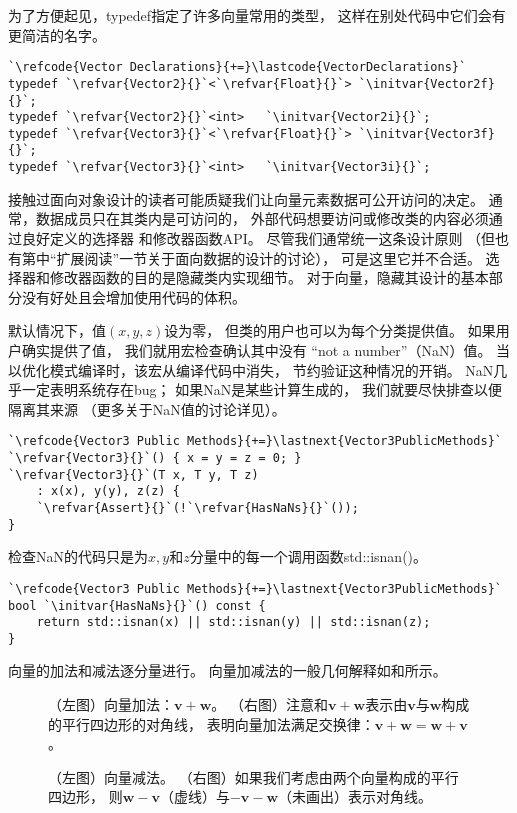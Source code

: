 为了方便起见，{\ttfamily typedef}指定了许多向量常用的类型，
这样在别处代码中它们会有更简洁的名字。
\begin{lstlisting}
`\refcode{Vector Declarations}{+=}\lastcode{VectorDeclarations}`
typedef `\refvar{Vector2}{}`<`\refvar{Float}{}`> `\initvar{Vector2f}{}`;
typedef `\refvar{Vector2}{}`<int>   `\initvar{Vector2i}{}`;
typedef `\refvar{Vector3}{}`<`\refvar{Float}{}`> `\initvar{Vector3f}{}`;
typedef `\refvar{Vector3}{}`<int>   `\initvar{Vector3i}{}`;
\end{lstlisting}

接触过面向对象设计的读者可能质疑我们让向量元素数据可公开访问的决定。
通常，数据成员只在其类内是可访问的，
外部代码想要访问或修改类的内容必须通过良好定义的选择器
和修改器函数API。
尽管我们通常统一这条设计原则
（但也有第中“扩展阅读”一节关于面向数据的设计的讨论），
可是这里它并不合适。
选择器和修改器函数的目的是隐藏类内实现细节。
对于向量，隐藏其设计的基本部分没有好处且会增加使用代码的体积。

默认情况下，值$(x,y,z)$设为零，
但类的用户也可以为每个分类提供值。
如果用户确实提供了值，
我们就用宏检查确认其中没有
“not a number”（NaN）值。
当以优化模式编译时，该宏从编译代码中消失，
节约验证这种情况的开销。
NaN几乎一定表明系统存在bug；
如果NaN是某些计算生成的，
我们就要尽快排查以便隔离其来源
（更多关于NaN值的讨论详见）。
\begin{lstlisting}
`\refcode{Vector3 Public Methods}{+=}\lastnext{Vector3PublicMethods}`
`\refvar{Vector3}{}`() { x = y = z = 0; }
`\refvar{Vector3}{}`(T x, T y, T z)
    : x(x), y(y), z(z) {
    `\refvar{Assert}{}`(!`\refvar{HasNaNs}{}`());
}
\end{lstlisting}

检查NaN的代码只是为$x,y$和$z$分量中的每一个调用函数{\ttfamily std::isnan()}。
\begin{lstlisting}
`\refcode{Vector3 Public Methods}{+=}\lastnext{Vector3PublicMethods}`
bool `\initvar{HasNaNs}{}`() const {
    return std::isnan(x) || std::isnan(y) || std::isnan(z);
}
\end{lstlisting}

向量的加法和减法逐分量进行。
向量加减法的一般几何解释如和所示。
\begin{figure}[htbp]
    \centering
    \caption{（左图）向量加法：$\bm v+\bm w$。
        （右图）注意和$\bm v+\bm w$表示由$\bm v$与$\bm w$构成的平行四边形的对角线，
        表明向量加法满足交换律：$\bm v+\bm w=\bm w+\bm v$。}
    \label{fig:2.3}
\end{figure}
\begin{figure}[htbp]
    \centering
    \caption{（左图）向量减法。
        （右图）如果我们考虑由两个向量构成的平行四边形，
        则$\bm w-\bm v$（虚线）与$-\bm v-\bm w$（未画出）表示对角线。}
    \label{fig:2.4}
\end{figure}


